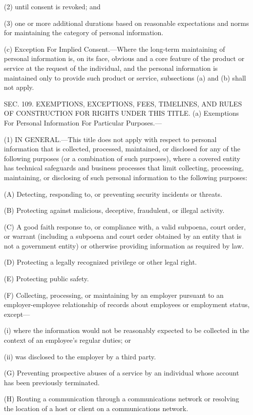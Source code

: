 (2) until consent is revoked; and

(3) one or more additional durations based on reasonable expectations and norms for maintaining the category of personal information.

(c) Exception For Implied Consent.—Where the long-term maintaining of personal information is, on its face, obvious and a core feature of the product or service at the request of the individual, and the personal information is maintained only to provide such product or service, subsections (a) and (b) shall not apply.


SEC. 109. EXEMPTIONS, EXCEPTIONS, FEES, TIMELINES, AND RULES OF CONSTRUCTION FOR RIGHTS UNDER THIS TITLE.
(a) Exemptions For Personal Information For Particular Purposes.—

(1) IN GENERAL.—This title does not apply with respect to personal information that is collected, processed, maintained, or disclosed for any of the following purposes (or a combination of such purposes), where a covered entity has technical safeguards and business processes that limit collecting, processing, maintaining, or disclosing of such personal information to the following purposes:

(A) Detecting, responding to, or preventing security incidents or threats.

(B) Protecting against malicious, deceptive, fraudulent, or illegal activity.

(C) A good faith response to, or compliance with, a valid subpoena, court order, or warrant (including a subpoena and court order obtained by an entity that is not a government entity) or otherwise providing information as required by law.

(D) Protecting a legally recognized privilege or other legal right.

(E) Protecting public safety.

(F) Collecting, processing, or maintaining by an employer pursuant to an employer-employee relationship of records about employees or employment status, except—

(i) where the information would not be reasonably expected to be collected in the context of an employee’s regular duties; or

(ii) was disclosed to the employer by a third party.

(G) Preventing prospective abuses of a service by an individual whose account has been previously terminated.

(H) Routing a communication through a communications network or resolving the location of a host or client on a communications network.


